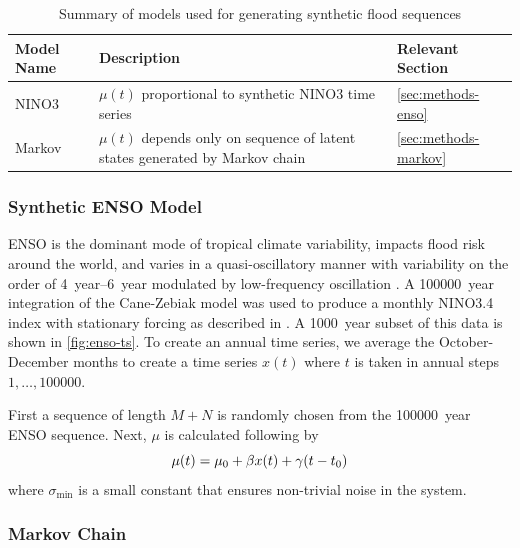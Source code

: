 \documentclass[11pt]{article}
\begin{document}
\begin{table}[bht]
  \begin{center}
    \begin{tabular}{L{1.0in} L{3.0in} L{1.5in}}
      \toprule
        Model Name & Description & Relevant Section \\
      \midrule
        NINO3 & \(\mu(t)\) proportional to synthetic NINO3 time series & \cref{sec:methods-enso} \\
        Markov & \(\mu(t)\) depends only on sequence of latent states generated by Markov chain & \cref{sec:methods-markov} \\
      \bottomrule
    \end{tabular}
  \end{center}
  \caption{Summary of models used for generating synthetic flood sequences\label{tab:model-generating}}
\end{table}

\subsubsection{Synthetic ENSO Model\label{sec:methods-enso}}

ENSO is the dominant mode of tropical climate variability, impacts flood risk around the world, and varies in a quasi-oscillatory manner with variability on the order of \SIrange{4}{6}{year} modulated by low-frequency oscillation \citep[see][for a comprehensive review]{Sarachik2010}.
A \SI{100000}{year} integration of the Cane-Zebiak model \citep{Zebiak1987} was used to produce a monthly NINO3.4 index with stationary forcing as described in \citet{Ramesh2017}.
A \SI{1000}{year} subset of this data is shown in \cref{fig:enso-ts}.
To create an annual time series, we average the October-December months to create a time series \( x(t) \) where \( t \) is taken in annual steps \(1, \ldots, \num{100000} \).

First a sequence of length \(M+N\) is randomly chosen from the \SI{100000}{year} ENSO sequence.
Next, \(\mu\) is calculated following by
\begin{equation}
  \mu(t) = \mu_0 + \beta x(t) + \gamma \qty(t - t_0)
\end{equation}
where \(\sigma_\text{min}\) is a small constant that ensures non-trivial noise in the system.

\subsubsection{Markov Chain\label{sec:methods-markov}}
\end{document}
